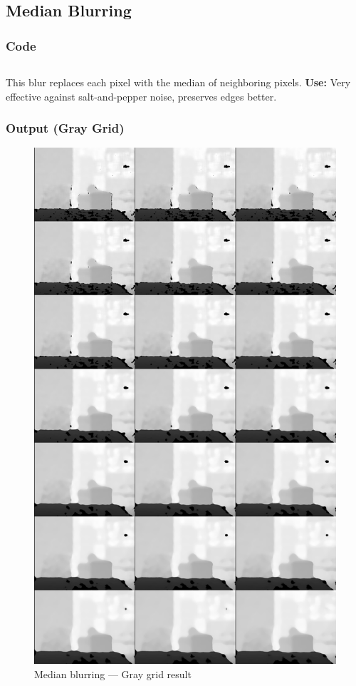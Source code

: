 \documentclass[a4paper,11pt]{article}
\begin{document}
	
	
	\subsection{Median Blurring}
	\subsubsection*{Code}
	\inputminted{python}{Python_Files/06_median_blur.py}
	
	This blur replaces each pixel with the median of neighboring pixels.  
	\textbf{Use:} Very effective against salt-and-pepper noise, preserves edges better.
	

	
	\subsubsection*{Output (Gray Grid)}
	\begin{figure}[H]
		\centering
		\includegraphics[width=\textwidth,height=0.9\textheight,keepaspectratio]{Images/blur/06_median_gray_grid.png}
		\caption{Median blurring — Gray grid result}
	\end{figure}
	\clearpage
	
\end{document}
